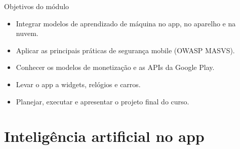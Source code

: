 \documentclass[aspectratio=169,10pt]{beamer}
\begin{document}
\capa

\begin{frame}{Objetivos do módulo}
  \begin{conceito}
    \begin{itemize}
      \item Integrar modelos de aprendizado de máquina no app, no aparelho e na nuvem.
      \item Aplicar as principais práticas de segurança mobile (OWASP MASVS).
      \item Conhecer os modelos de monetização e as APIs da Google Play.
      \item Levar o app a widgets, relógios e carros.
      \item Planejar, executar e apresentar o projeto final do curso.
    \end{itemize}
  \end{conceito}
\end{frame}

\sumario

\section{Inteligência artificial no app}
\end{document}
